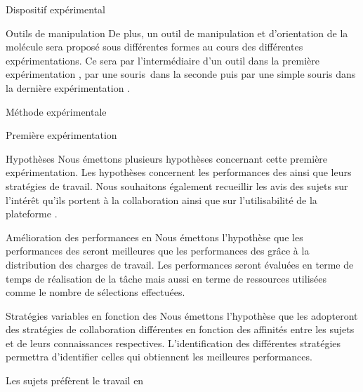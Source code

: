 \documentclass[myfrancais,ngerman,english,french]{mythesis}
\begin{document}
\begin{mychapter}{Dispositif expérimental}
\begin{mysection}{Outils de manipulation}
			De plus, un outil de manipulation et d'orientation de la molécule sera proposé sous différentes formes au cours des différentes expérimentations.
			Ce sera par l'intermédiaire d'un outil  dans la première expérimentation , par une souris~\myThreeD dans la seconde  puis par une simple souris \myUSB dans la dernière expérimentation .
		\end{mysection}
	\end{mychapter}
	\begin{mychapter}{Méthode expérimentale}
		\begin{mysection}{Première expérimentation}
			\begin{mysubsection}{Hypothèses}
				Nous émettons plusieurs hypothèses concernant cette première expérimentation.
				Les hypothèses concernent les performances des  ainsi que leurs stratégies de travail.
				Nous souhaitons également recueillir les avis des sujets sur l'intérêt qu'ils portent à la collaboration ainsi que sur l'utilisabilité de la plateforme \myShaddock.
				\begin{myparagraph}{ Amélioration des performances en }
					Nous émettons l'hypothèse que les performances des  seront meilleures que les performances des  grâce à la distribution des charges de travail.
					Les performances seront évaluées en terme de temps de réalisation de la tâche mais aussi en terme de ressources utilisées comme le nombre de sélections effectuées.
				\end{myparagraph}
				\begin{myparagraph}{ Stratégies variables en fonction des }
					Nous émettons l'hypothèse que les  adopteront des stratégies de collaboration différentes en fonction des affinités entre les sujets et de leurs connaissances respectives.
					L'identification des différentes stratégies permettra d'identifier celles qui obtiennent les meilleures performances.
				\end{myparagraph}
				\begin{myparagraph}{ Les sujets préfèrent le travail en }

\end{myparagraph}
\end{mysubsection}
\end{mysection}
\end{mychapter}
\end{document}
